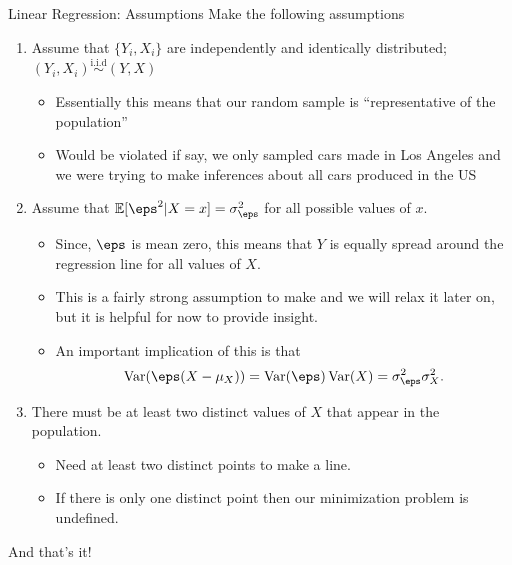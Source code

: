 \documentclass[notheorems, 9pt, handout]{beamer}
\begin{document}
\begin{frame}{Linear Regression: Assumptions} 
	\label{frame:assm-2}
	Make the following assumptions
	\begin{enumerate}
		\item<1->  Assume that \(\{Y_i,X_i\}\) are independently and identically distributed; \((Y_i,X_i) \overset{\text{i.i.d}}{\sim} (Y,X)\)
		\begin{itemize}
			\item<1|only@1> Essentially this means that our random sample is ``representative of the population'' 
			\item<1|only@1> Would be violated if say, we only sampled cars made in Los Angeles and we were trying to make inferences about all cars produced in the US
		\end{itemize}
		\item<2->  Assume that \(\E[\eps^2|X=x]= \sigma_\eps^2 \) for all possible values of \(x\).
		\begin{itemize}
			\item<2|only@2> Since, \(\eps\) is mean zero, this means that \(Y\) is equally spread around the regression line for all values of \(X\).
			\item<2|only@2> This is a fairly strong assumption to make and we will relax it later on, but it is helpful for now to provide insight.
			\item<2->An important implication of this is that
			\[
				\Var(\eps(X-\mu_X)) = \Var(\eps)\Var(X) = \sigma_\eps^2\sigma_X^2
			.\] 
			\only<2>{\green{Questions?}}
		\end{itemize}
		\item<3->  There must be at least two distinct values of \(X\) that appear in the population.
		\begin{itemize}
			\item<3|only@3> Need at least two distinct points to make a line. 
			\item<3|only@3> If there is only one distinct point then our minimization problem is undefined.
		\end{itemize}
	\end{enumerate}
	And that's it!
\end{frame}
\end{document}
